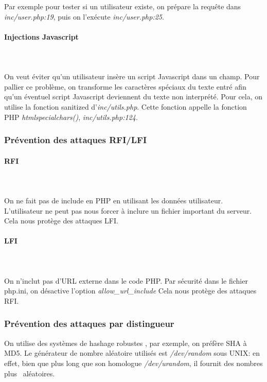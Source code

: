 \documentclass[a4paper]{article}
\begin{document}
Par exemple pour tester si un utilisateur existe, on prépare la requête
dans \textit{inc/user.php:19}, puis on l'exécute \textit{inc/user.php:25}.

\paragraph{Injections Javascript}
~~\\
\\
On veut éviter qu'un utilisateur insère un script Javascript dans un champ.
Pour pallier ce problème, on transforme les caractères spéciaux du texte entré afin
qu'un éventuel script Javascript deviennent du texte non interprété.
Pour cela, on utilise la fonction sanitized d'\textit{inc/utils.php}. Cette fonction
appelle la fonction PHP \textit{htmlspecialchars()}, \textit{inc/utils.php:124}.
		
\subsubsection{Prévention des attaques RFI/LFI}
		
\paragraph{RFI}
~~\\
\\
On ne fait pas de include en PHP en utilisant les données utilisateur.
L'utilisateur ne peut pas nous forcer à inclure un fichier important du serveur.
Cela nous protège des attaques LFI.

\paragraph{LFI}
~~\\
\\
On n'inclut pas d'URL externe dans le code PHP.
Par sécurité dans le fichier php.ini, on désactive l'option \textit{allow\_url\_include} 
Cela nous protège des attaques RFI.

\subsubsection{Prévention des attaques par distingueur}
On utilise des systèmes de hashage \og robustes \fg, par exemple, on
préfère SHA à MD5. Le générateur de nombre aléatoire utilisés est \textit{/dev/random}
sous UNIX: en effet, bien que plus long que son homologue \textit{/dev/urandom},
il fournit des nombres \og plus \fg\ aléatoires.
		
\end{document}
